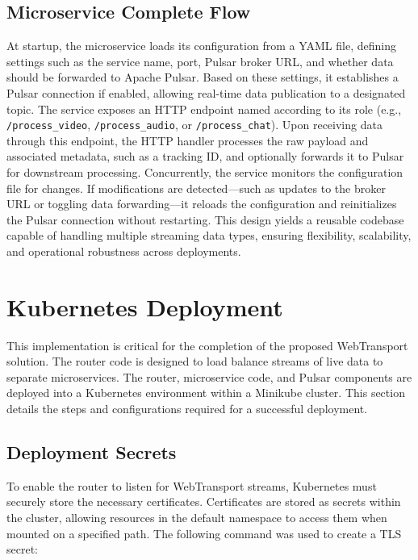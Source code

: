 \subsection{Microservice Complete Flow}
At startup, the microservice loads its configuration from a YAML file, defining settings such as the service name, port, Pulsar broker URL, and whether data should be forwarded to Apache Pulsar. Based on these settings, it establishes a Pulsar connection if enabled, allowing real-time data publication to a designated topic. The service exposes an HTTP endpoint named according to its role (e.g., \texttt{/process\_video}, \texttt{/process\_audio}, or \texttt{/process\_chat}). Upon receiving data through this endpoint, the HTTP handler processes the raw payload and associated metadata, such as a tracking ID, and optionally forwards it to Pulsar for downstream processing. Concurrently, the service monitors the configuration file for changes. If modifications are detected—such as updates to the broker URL or toggling data forwarding—it reloads the configuration and reinitializes the Pulsar connection without restarting. This design yields a reusable codebase capable of handling multiple streaming data types, ensuring flexibility, scalability, and operational robustness across deployments.




\section{Kubernetes Deployment}
This implementation is critical for the completion of the proposed WebTransport solution. The router code is designed to load balance streams of live data to separate microservices. The router, microservice code, and Pulsar components are deployed into a Kubernetes environment within a Minikube cluster. This section details the steps and configurations required for a successful deployment.

\subsection{Deployment Secrets}
To enable the router to listen for WebTransport streams, Kubernetes must securely store the necessary certificates. Certificates are stored as secrets within the cluster, allowing resources in the default namespace to access them when mounted on a specified path. The following command was used to create a TLS secret:

